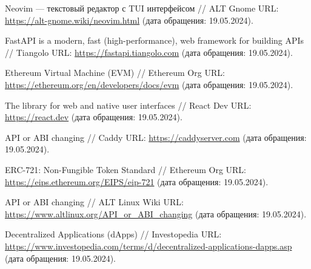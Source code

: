 \begin{thebibliography}{99\kern\bibindent}
	 Neovim — текстовый редактор с TUI интерфейсом // ALT Gnome URL: \url{https://alt-gnome.wiki/neovim.html} (дата обращения: 19.05.2024).

	 FastAPI is a modern, fast (high-performance), web framework for building APIs // Tiangolo URL: \url{https://fastapi.tiangolo.com} (дата обращения: 19.05.2024).

	 Ethereum Virtual Machine (EVM) // Ethereum Org URL: \url{https://ethereum.org/en/developers/docs/evm} (дата обращения: 19.05.2024).

	 The library for web and native user interfaces // React Dev URL: \url{https://react.dev} (дата обращения: 19.05.2024).

	 API or ABI changing // Caddy URL: \url{https://caddyserver.com} (дата обращения: 19.05.2024).

	 ERC-721: Non-Fungible Token Standard // Ethereum Org URL: \url{https://eips.ethereum.org/EIPS/eip-721} (дата обращения: 19.05.2024).

	 API or ABI changing // ALT Linux Wiki URL: \url{https://www.altlinux.org/API_or_ABI_changing} (дата обращения: 19.05.2024).

	 Decentralized Applications (dApps) // Investopedia URL: \url{https://www.investopedia.com/terms/d/decentralized-applications-dapps.asp} (дата обращения: 19.05.2024).

	

	\begin{comment}
	\bibitem{bib:reestrpo} Классификатор ПО (в ред. приказов Минцифры России от 22.09.2020 № 486, 26.04.2022 № 393, от 22.12.2022 № 974) // ЦКИТ URL: \url{https://ru-ikt.ru/reestrpo} (дата обращения: 04.05.2024).

	\bibitem{bib:reestrpo_docs_list} Перечень документов для внесения ПО в отечественный реестр // Гардиум URL: \url{https://legal-support.ru/information/blog/programmy/perechen-dokumentov-dlya-vneseniya-po-v-reestr} (дата обращения: 04.05.2024).

	\bibitem{bib:cocomoii_gen} Лекции по управлению программными проектами // CIT Forum URL: \url{http://citforum.ru/SE/project/arkhipenkov_lectures/13.shtml} (дата обращения: 04.05.2024).

	\bibitem{bib:cocomoii_win} Садовский И. Д. // Применение модели COCOMO II для оценки разработки программного обеспечения в Windows проектах // Экономика и бизнес: теория и практика. 2016. №10. %


\end{comment}
\end{thebibliography}
